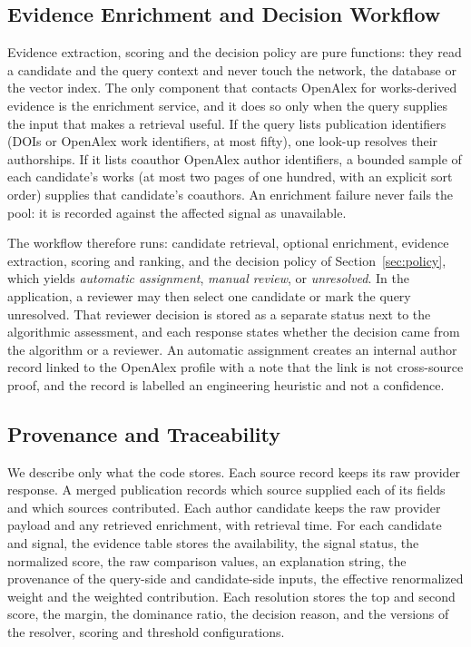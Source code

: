 \subsection{Evidence Enrichment and Decision Workflow}
Evidence extraction, scoring and the decision policy are pure functions: they read a candidate and the query context and never touch the network, the database or the vector index. The only component that contacts OpenAlex for works-derived evidence is the enrichment service, and it does so only when the query supplies the input that makes a retrieval useful. If the query lists publication identifiers (DOIs or OpenAlex work identifiers, at most fifty), one look-up resolves their authorships. If it lists coauthor OpenAlex author identifiers, a bounded sample of each candidate's works (at most two pages of one hundred, with an explicit sort order) supplies that candidate's coauthors. An enrichment failure never fails the pool: it is recorded against the affected signal as unavailable.

The workflow therefore runs: candidate retrieval, optional enrichment, evidence extraction, scoring and ranking, and the decision policy of Section~\ref{sec:policy}, which yields \emph{automatic assignment}, \emph{manual review}, or \emph{unresolved}. In the application, a reviewer may then select one candidate or mark the query unresolved. That reviewer decision is stored as a separate status next to the algorithmic assessment, and each response states whether the decision came from the algorithm or a reviewer. An automatic assignment creates an internal author record linked to the OpenAlex profile with a note that the link is not cross-source proof, and the record is labelled an engineering heuristic and not a confidence.

\subsection{Provenance and Traceability}
We describe only what the code stores. Each source record keeps its raw provider response. A merged publication records which source supplied each of its fields and which sources contributed. Each author candidate keeps the raw provider payload and any retrieved enrichment, with retrieval time. For each candidate and signal, the evidence table stores the availability, the signal status, the normalized score, the raw comparison values, an explanation string, the provenance of the query-side and candidate-side inputs, the effective renormalized weight and the weighted contribution. Each resolution stores the top and second score, the margin, the dominance ratio, the decision reason, and the versions of the resolver, scoring and threshold configurations.

